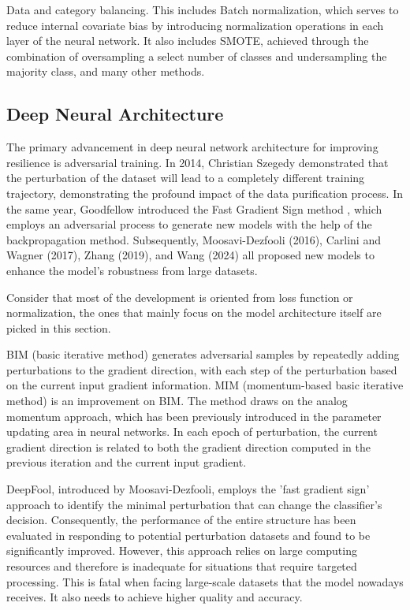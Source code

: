\documentclass{article}
\begin{document}
Data and category balancing. This includes Batch normalization\cite{ioffe2015batchnormalizationacceleratingdeep}, which serves to reduce internal covariate bias by introducing normalization operations in each layer of the neural network. It also includes SMOTE\cite{Chawla_2002}, achieved through the combination of oversampling a select number of classes and undersampling the majority class, and many other methods.


\subsection{Deep Neural Architecture}

The primary advancement in deep neural network architecture for improving resilience is adversarial training. In 2014, Christian Szegedy demonstrated that the perturbation of the dataset will lead to a completely different training trajectory\cite{szegedy2013intriguing}, demonstrating the profound impact of the data purification process. In the same year, Goodfellow introduced the Fast Gradient Sign method\cite{goodfellow2014generative} , which employs an adversarial process to generate new models with the help of the backpropagation method. Subsequently, Moosavi-Dezfooli (2016), Carlini and Wagner (2017), Zhang (2019), and Wang (2024) all proposed new models to enhance the model's robustness from large datasets.

Consider that most of the development is oriented from loss function or normalization, the ones that mainly focus on the model architecture itself are picked in this section.

BIM (basic iterative method) \cite{kurakin2017adversarialmachinelearningscale} generates adversarial samples by repeatedly adding perturbations to the gradient direction, with each step of the perturbation based on the current input gradient information. MIM (momentum-based basic iterative method) \cite{dong2018boosting} is an improvement on BIM. The method draws on the analog momentum approach, which has been previously introduced in the parameter updating area in neural networks. In each epoch of perturbation, the current gradient direction is related to both the gradient direction computed in the previous iteration and the current input gradient.

DeepFool\cite{moosavi2016deepfool}, introduced by Moosavi-Dezfooli, employs the 'fast gradient sign' approach to identify the minimal perturbation that can change the classifier's decision. Consequently, the performance of the entire structure has been evaluated in responding to potential perturbation datasets and found to be significantly improved. However, this approach relies on large computing resources and therefore is inadequate for situations that require targeted processing. This is fatal when facing large-scale datasets that the model nowadays receives. It also needs to achieve higher quality and accuracy.
\end{document}

